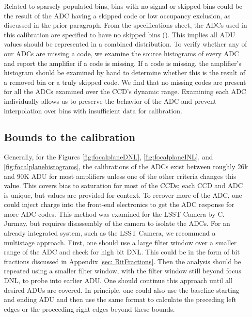 \documentclass[linenumbers]{aastex7}
\begin{document}
Related to sparsely populated bins, bins with no signal or skipped bins could be the result of the ADC having a skipped code or low occupancy exclusion, as discussed in the prior paragraph.
From the specifications sheet, the ADCs used in this calibration are specified to have no skipped bins (\cite{AnalogDevices}). 
This implies all ADU values should be represented in a combined distribution.
To verify whether any of our ADCs are missing a code, we examine the source histograms of every ADC and report the amplifier if a code is missing. 
If a code is missing, the amplifier's histogram should be examined by hand to determine whether this is the result of a removed bin or a truly skipped code. 
We find that no missing codes are present for all the ADCs examined over the CCD's dynamic range.
Examining each ADC individually allows us to preserve the behavior of the ADC and prevent interpolation over bins with insufficient data for calibration.

\subsection{Bounds to the calibration}
\label{sec:Recommended start}

Generally, for the Figures \ref{fig:focalplaneDNL},  \ref{fig:focalplaneINL}, and \ref{fig:focalplanehistograms}, the calibrations of the ADCs exist between roughly 26k and 90K ADU for most amplifiers unless one of the other criteria changes this value. 
This covers bias to saturation for most of the CCDs; each CCD and ADC is unique, but values are provided for context.
To recover more of the ADC, one could inject charge into the front-end electronics to get the ADC response for more ADC codes.
This method was examined for the LSST Camera by C. Jurmay, but requires disassembly of the camera to isolate the ADCs. 
For an already integrated system, such as the LSST Camera, we recommend a multistage approach.
First, one should use a large filter window over a smaller range of the ADC and check for high bit DNL. 
This could be in the form of bit fractions discussed in Appendix \ref{sec: BitFractions}. 
Then the analysis should be repeated using a smaller filter window, with the filter window still beyond focus DNL, to probe into earlier ADU. 
One should continue this approach until all desired ADUs are covered. 
In principle, one could also use the baseline starting and ending ADU and then use the same format to calculate the preceding left edges or the proceeding right edges beyond these bounds.
\end{document}

